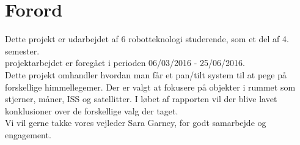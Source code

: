 \section*{Forord}

Dette projekt er udarbejdet af 6 robotteknologi studerende, som et del af 4. semester.\\ projektarbejdet er foregået i perioden 06/03/2016 - 25/06/2016. 
\\
Dette projekt omhandler hvordan man får et pan/tilt system til at pege på forskellige himmellegemer. Der er valgt at fokusere på objekter i rummet som stjerner, måner, ISS og satellitter. I løbet af rapporten vil der blive lavet konklusioner over de forskellige valg der taget.
\\
Vi vil gerne takke vores vejleder Sara Garney, for godt samarbejde og engagement.